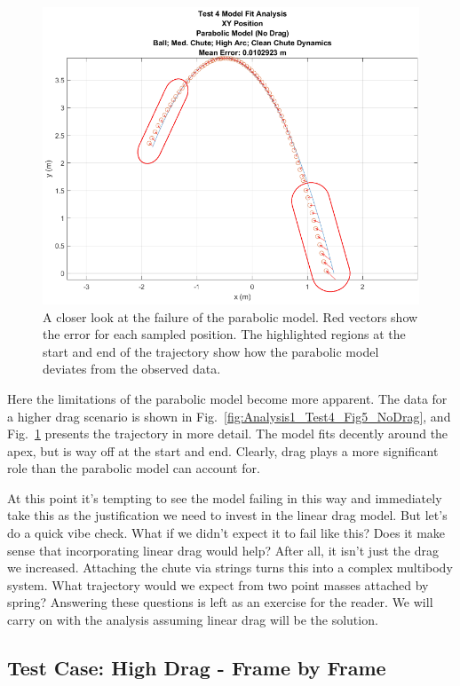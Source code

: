 \begin{figure}[t]
\centering
\includegraphics[width=0.9\linewidth]{images/Analysis1_Test4_Err_NoDrag.png}
\caption{\label{fig:Analysis1_Test4_Err_NoDrag} A closer look at the failure of the parabolic model. Red vectors show the error for each sampled position. The highlighted regions at the start and end of the trajectory show how the parabolic model deviates from the observed data.}
\end{figure}

Here the limitations of the parabolic model become more apparent. The data for a higher drag scenario is shown in Fig.~\ref{fig:Analysis1_Test4_Fig5_NoDrag}, and Fig.~\ref{fig:Analysis1_Test4_Err_NoDrag} presents the trajectory in more detail. The model fits decently around the apex, but is way off at the start and end. Clearly, drag plays a more significant role than the parabolic model can account for. 

At this point it's tempting to see the model failing in this way and immediately take this as the justification we need to invest in the linear drag model. But let's do a quick vibe check. What if we didn't expect it to fail like this? Does it make sense that incorporating linear drag would help? After all, it isn't just the drag we increased. Attaching the chute via strings turns this into a complex multibody system. What trajectory would we expect from two point masses attached by spring? Answering these questions is left as an exercise for the reader. We will carry on with the analysis assuming linear drag will be the solution.


\subsection{Test Case: High Drag - Frame by Frame}


